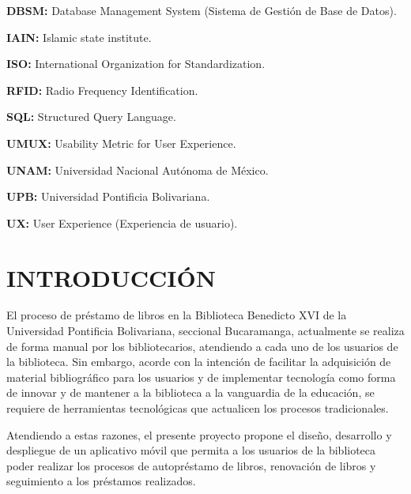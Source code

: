 \documentclass[spanish]{ieee_upb}
\begin{document}
\vspace{0.1cm}
\textbf{DBSM: } Database Management System (Sistema de Gestión de Base de Datos).

\vspace{0.1cm}
\textbf{IAIN: } Islamic state institute.

\vspace{0.1cm}
\textbf{ISO: } International Organization for Standardization.

\vspace{0.1cm}
\textbf{RFID: } Radio Frequency Identification.

\vspace{0.1cm}
\textbf{SQL: } Structured Query Language. 

\vspace{0.1cm}
\textbf{UMUX: } Usability Metric for User Experience.

\vspace{0.1cm}
\textbf{UNAM: } Universidad Nacional Autónoma de México.

\vspace{0.1cm}
\textbf{UPB: } Universidad Pontificia Bolivariana.

\vspace{0.1cm}
\textbf{UX: } User Experience (Experiencia de usuario).



\newpage
\section{INTRODUCCIÓN}
El proceso de préstamo de libros en la Biblioteca Benedicto XVI de la Universidad Pontificia Bolivariana, seccional Bucaramanga, actualmente se realiza de forma manual por los bibliotecarios, atendiendo a cada uno de los usuarios de la biblioteca. Sin embargo, acorde con la intención de facilitar la adquisición de material bibliográfico para los usuarios y de implementar tecnología como forma de innovar y de mantener a la biblioteca a la vanguardia de la educación, se requiere de herramientas tecnológicas que actualicen los procesos tradicionales.
\vspace{0.3 cm}

Atendiendo a estas razones, el presente proyecto propone el diseño, desarrollo y despliegue de un aplicativo móvil que permita a los usuarios de la biblioteca poder realizar los procesos de autopréstamo de libros, renovación de libros y seguimiento a los préstamos realizados.
\vspace{0.3 cm}
\end{document}
